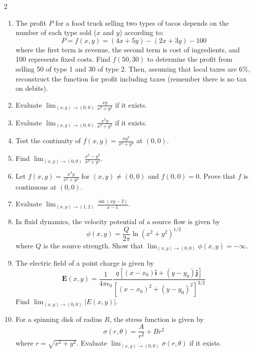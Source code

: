 \begin{multicols}{2}
\begin{enumerate}
    \item The profit $P$ for a food truck selling two types of tacos depends on the number of each type sold ($x$ and $y$) according to:
    \[
    P = f(x,y) = (4x + 5y) - (2x + 3y) - 100
    \]
    where the first term is revenue, the second term is cost of ingredients, and 100 represents fixed costs. Find $f(50,30)$ to determine the profit from selling 50 of type 1 and 30 of type 2. Then, assuming that local taxes are $6\%$, reconstruct the function for profit including taxes (remember there is no tax on debits).

    \item Evaluate $\lim_{(x,y) \to (0,0)} \frac{xy}{x^2 + y^2}$ if it exists.
    
    \item Evaluate $\lim_{(x,y) \to (0,0)} \frac{x^2y}{x^2 + y^2}$ if it exists.
    
    \item Test the continuity of $f(x,y) = \frac{xy^2}{x^2 + y^4}$ at $(0,0)$.
    
    \item Find $\lim_{(x,y) \to (0,0)} \frac{x^2 - y^2}{x^2 + y^2}$.
    
    \item Let $f(x,y) = \frac{x^3y}{x^4 + y^2}$ for $(x,y) \neq (0,0)$ and $f(0,0) = 0$. Prove that $f$ is continuous at $(0,0)$.
    
    \item Evaluate $\lim_{(x,y) \to (1,2)} \frac{\sin(xy-2)}{x-1}$.
    
    \item In fluid dynamics, the velocity potential of a source flow is given by 
    \[
    \phi(x,y) = \frac{Q}{2\pi}\ln(x^2 + y^2)^{1/2}
    \]
    where $Q$ is the source strength. Show that $\lim_{(x,y) \to (0,0)} \phi(x,y) = -\infty$.
    
    \item The electric field of a point charge is given by 
\[
\mathbf{E}(x, y) = \frac{1}{4\pi\epsilon_0} \frac{q \left[ (x - x_0)\mathbf{i} + (y - y_0)\mathbf{j} \right]}{\left[ (x - x_0)^2 + (y - y_0)^2 \right]^{3/2}}
\]
    Find $\lim_{(x,y) \to (0,0)} |E(x,y)|$.
    
    \item For a spinning disk of radius $R$, the stress function is given by
    \[
    \sigma(r,\theta) = \frac{A}{r^2} + Br^2
    \]
    where $r = \sqrt{x^2 + y^2}$. Evaluate $\lim_{(x,y) \to (0,0)} \sigma(r,\theta)$ if it exists.


\end{enumerate}
\end{multicols}
